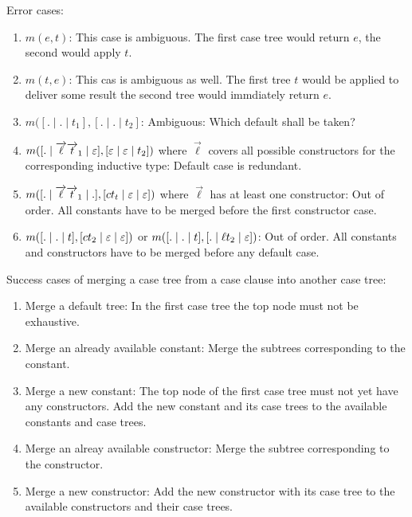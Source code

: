 \noindent Error cases:
\begin{enumerate}
    \item $m(e, t)$: This case is ambiguous. The first case tree would return
        $e$, the second would apply $t$.

    \item $m(t, e)$: This cas is ambiguous as well. The first tree $t$ would be
        applied to deliver some result the second tree would immdiately return
        $e$.

    \item $m([. \mid . \mid t_1], [. \mid .  \mid t_2]$: Ambiguous: Which
        default shall be taken?

    \item $m([. \mid {\overrightarrow {\ell}} {\overrightarrow {t}}_1 \mid \varepsilon],
        [\varepsilon \mid \varepsilon \mid t_2])$ where $\vec \ell$ covers all
        possible constructors for the corresponding inductive type: Default case
        is redundant.

    \item $m([. \mid {\overrightarrow {\ell}} {\overrightarrow {t}}_1 \mid .],
        [ct_t \mid \varepsilon \mid \varepsilon])$ where $\vec \ell$ has at least
        one constructor: Out of order. All constants have to be merged before
        the first constructor case.

    \item $m([. \mid . \mid t], [ c t_2 \mid \varepsilon \mid \varepsilon])$
        or
        $m([. \mid . \mid t], [ . \mid \ell t_2 \mid \varepsilon])$: Out of order. All
        constants and constructors have to be merged before any default case.
\end{enumerate}

\noindent Success cases of merging a case tree from a case clause into another
case tree:
\begin{enumerate}
    \item Merge a default tree: In the first case tree the top node must not be
        exhaustive.

    \item Merge an already available constant: Merge the subtrees corresponding
        to the constant.

    \item Merge a new constant: The top node of the first case tree must not yet
        have any constructors. Add the new constant and its case trees to the
        available constants and case trees.

    \item Merge an alreay available constructor: Merge the subtree corresponding
        to the constructor.

    \item Merge a new constructor: Add the new constructor with its case tree to
        the available constructors and their case trees.
\end{enumerate}




